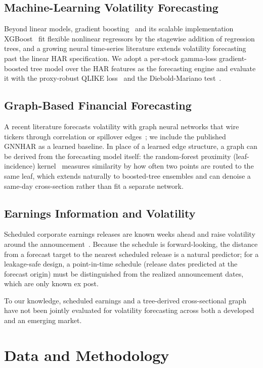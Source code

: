 \documentclass[runningheads]{llncs}
\begin{document}
\subsection{Machine-Learning Volatility Forecasting}
Beyond linear models, gradient boosting~\cite{friedman2001} and its scalable implementation
XGBoost~\cite{chen2016} fit flexible nonlinear regressors by the stagewise addition of regression trees,
and a growing neural time-series literature extends volatility forecasting past the linear HAR
specification. We adopt a per-stock gamma-loss gradient-boosted tree model over the HAR features as the
forecasting engine and evaluate it with the proxy-robust QLIKE loss~\cite{patton2011} and the
Diebold-Mariano test~\cite{dm1995,hln1997}.

\subsection{Graph-Based Financial Forecasting}
A recent literature forecasts volatility with graph neural networks that wire tickers through correlation
or spillover edges~\cite{gnnhar2024}; we include the published GNNHAR as a learned baseline. In place of a
learned edge structure, a graph can be derived from the forecasting model itself: the random-forest
proximity (leaf-incidence) kernel~\cite{rhodes2023} measures similarity by how often two points are routed
to the same leaf, which extends naturally to boosted-tree ensembles and can denoise a same-day
cross-section rather than fit a separate network.

\subsection{Earnings Information and Volatility}
Scheduled corporate earnings releases are known weeks ahead and raise volatility around the
announcement~\cite{patell1981}. Because the schedule is forward-looking, the distance from a forecast
target to the nearest scheduled release is a natural predictor; for a leakage-safe design, a
point-in-time schedule (release dates predicted at the forecast origin) must be distinguished from the
realized announcement dates, which are only known ex post.

To our knowledge, scheduled earnings and a tree-derived cross-sectional graph have not been jointly
evaluated for volatility forecasting across both a developed and an emerging market.

\FloatBarrier

\section{Data and Methodology}
\end{document}

